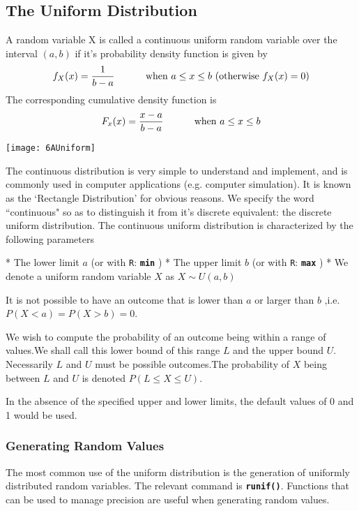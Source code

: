 \subsection{The Uniform Distribution}

A random variable X is called a continuous uniform random variable over the interval $(a,b)$ if it's probability density function is given by
\[ f_{X}(x) = { 1 \over b-a} \hspace{1cm} \mbox{ when } a \leq x \leq b \mbox{     (otherwise } f_X(x) = 0 ) \]
The corresponding cumulative density function is
\[ F_x(x) = { x-a \over b-a} \hspace{1cm} \mbox{ when } a \leq x \leq b\]


\begin{center}
\texttt{[image: 6AUniform]}
\end{center}
The continuous distribution is very simple to understand and implement, and is commonly used in computer applications (e.g. computer simulation).
It is known as the `Rectangle Distribution' for obvious reasons. We specify the word ``continuous" so as to distinguish it from it's discrete equivalent: the discrete uniform distribution.
The continuous uniform distribution is characterized by the following parameters

\begin{itemize}
*  The lower limit $a$ (or with \texttt{R}: \texttt{\textbf{min}} )
*  The upper limit $b$ (or with \texttt{R}: \texttt{\textbf{max}} )
*  We denote a uniform random variable $X$ as $X \sim U(a,b)$
\end{itemize}

It is not possible to have an outcome that is lower than $a$ or larger than $b$ ,i.e. $ P(X < a) = P(X > b) = 0$.

We wish to compute the probability of an outcome being within a range of values.We shall call this lower bound of this range $L$ and the upper bound $ U$. Necessarily $L$ and $U$ must be possible outcomes.The probability of $X$ being between $L$ and $U$ is denoted $P( L \leq X \leq U )$.

In the absence of the specified upper and lower limits, the default values of 0 and 1 would be used.

\subsubsection{Generating Random Values}
The most common use of the uniform distribution is the generation of uniformly distributed random variables. The relevant command is \texttt{\textbf{runif()}}. Functions that can be used to manage precision are useful when generating random values.


